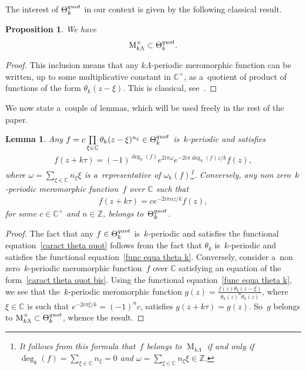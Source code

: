 \documentclass[10pt,a4paper]{amsart}
\numberwithin{equation}{section}
\newtheorem{Lemma}[Theorem]{Lemma}
\newtheorem{Proposition}[Theorem]{Proposition}
{ \theoremstyle{definition}
\newtheorem{Definition}[Theorem]{Definition}
\newtheorem{Remark}[Theorem]{Remark} }
\newcommand{\weight}[1]{\omega_{#1}}
\newcommand{\degr}[1]{\deg_{#1}}
\newcommand{\quotprodtheta}[1]{\Theta_{#1}^{\rm quot}}
\begin{document}
The interest of $\quotprodtheta{k}$ in our context is given by the following classical result.

\begin{Proposition}
We have
\begin{gather*}
\operatorname{M}_{k\Lambda}^{\times} \subset \quotprodtheta{k}.
\end{gather*}
\end{Proposition}

\begin{proof}
This inclusion means that any $k\Lambda$-periodic meromorphic function can be written, up to some multiplicative
constant in $\mathbb C^{\times}$, as a~quotient of product of functions of the form $\theta_{k}(z-\xi)$.
This is classical, see~\cite[Chapter I, Section~6]{Mumford}.
\end{proof}

We now state a~couple of lemmas, which will be used freely in the rest of the paper.

\begin{Lemma}
\label{form precise}
Any $f= c  \prod\limits_{\xi \in \mathbb C} \theta_{k}(z-\xi)^{n_{\xi}} \in \quotprodtheta{k}$
is~$k$-periodic and satisfies
\begin{gather}
\label{caract theta quot}
f(z+k\tau)=(-1)^{\degr{k} (f)} e^{2i\pi \omega} e^{-2i\pi \degr{k} (f) z/k}f(z),
\end{gather}
where   $\omega = \sum\limits_{\xi \in \mathbb C} n_\xi \xi$ is a~representative of $\weight{k}(f)$\footnote{It follows
from this formula that~$f$ belongs to $\operatorname{M}_{k\Lambda}$ if and only if $\degr{k} (f)=\sum\limits_{\xi \in
\mathbb C} n_\xi=0$ and $\omega=\sum\limits_{\xi \in \mathbb C} n_\xi \xi \in \mathbb Z$.}.
Conversely, any non zero~$k$-periodic meromorphic function~$f$ over $\mathbb C$ such that
\begin{gather}
\label{caract theta quot bis}
f(z+k\tau)=c e^{-2i\pi n z/k}f(z),
\end{gather}
for some $c \in \mathbb C^{\times}$ and $n \in \mathbb Z$, belongs to~$\quotprodtheta{k}$.
\end{Lemma}

\begin{proof}
The fact that any $f \in \quotprodtheta{k}$ is~$k$-periodic and satisf\/ies the functional equation~\eqref{caract theta
quot} follows from the fact that $\theta_{k}$ is~$k$-periodic and satisf\/ies the functional equation~\eqref{func equa
theta k}.
Conversely, consider a~non zero~$k$-periodic meromorphic function~$f$ over $\mathbb C$ satisfying an equation of the
form~\eqref{caract theta quot bis}.
Using the functional equation~\eqref{func equa theta k}, we see that the~$k$-periodic meromorphic function
$g(z)=\frac{f(z) \theta_{k}(z-\xi)}{\theta_{k}(z)^{n} \theta_{k}(z)}$, where $\xi \in \mathbb C$ is such that $e^{-2i\pi
\xi/k}=(-1)^{n}c$, satisf\/ies $g(z+k\tau)=g(z)$.
So~$g$ belongs to $\operatorname{M}_{k\Lambda}^{\times} \subset \quotprodtheta{k}$, whence the result.
\end{proof}
\end{document}
